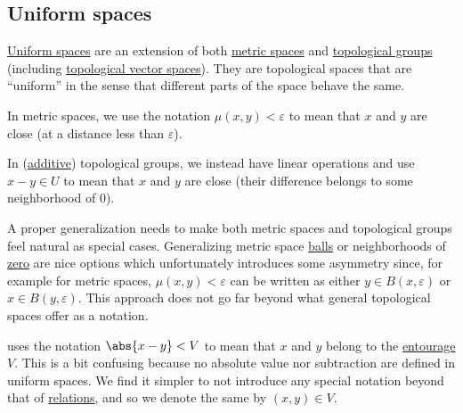 \subsection{Uniform spaces}\label{subsec:uniform_spaces}

\begin{remark}\label{rem:entourage_notation}
  \hyperref[def:uniform_space]{Uniform spaces} are an extension of both \hyperref[def:metric_space]{metric spaces} and \hyperref[def:topological_group]{topological groups} (including \hyperref[def:topological_vector_space]{topological vector spaces}). They are topological spaces that are \enquote{uniform} in the sense that different parts of the space behave the same.

  In metric spaces, we use the notation \( \mu(x, y) < \varepsilon \) to mean that \( x \) and \( y \) are close (at a distance less than \( \varepsilon \)).

  In (\hyperref[con:additive_semigroup]{additive}) topological groups, we instead have linear operations and use \( x - y \in U \) to mean that \( x \) and \( y \) are close (their difference belongs to some neighborhood of \( 0 \)).

  A proper generalization needs to make both metric spaces and topological groups feel natural as special cases. Generalizing metric space \hyperref[def:metric_space/ball]{balls} or neighborhoods of \hyperref[thm:origin_neighborhoods_in_topological_groups]{zero} are nice options which unfortunately introduces some asymmetry since, for example for metric spaces, \( \mu(x, y) < \varepsilon \) can be written as either \( y \in B(x, \varepsilon) \) or \( x \in B(y, \varepsilon) \). This approach does not go far beyond what general topological spaces offer as a notation.

  \cite[section 8]{Engelking1989} uses the notation \( \abs{x - y} < V \) to mean that \( x \) and \( y \) belong to the \hyperref[def:entourage]{entourage} \( V \). This is a bit confusing because no absolute value nor subtraction are defined in uniform spaces. We find it simpler to not introduce any special notation beyond that of \hyperref[def:relation]{relations}, and so we denote the same by \( (x, y) \in V \).
\end{remark}

